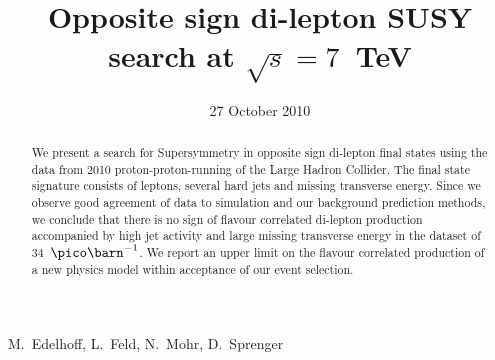 \documentclass{cmspaper}
\newcommand{\pb}{\pico\barn}
\newcommand{\pbi}{\ensuremath{\pb^{-1}}}
\begin{document}
\linenumbers



\begin{titlepage}

   \date{27 October 2010}

  \title{Opposite sign di-lepton SUSY search at $\sqrt{s}=7$~TeV}

  \begin{Authlist}
      M.~Edelhoff, L.~Feld, N.~Mohr, D.~Sprenger
  \end{Authlist}

  \begin{abstract}
  We present a search for Supersymmetry in opposite sign di-lepton final states 
  using the data from 2010 proton-proton-running of the Large Hadron Collider. 
  The final state signature consists of leptons, several hard jets 
  and missing transverse energy. 
  Since we observe good agreement of data to simulation and our background prediction methods,
  we conclude that there is no sign of flavour correlated di-lepton production 
  accompanied by high jet activity and large missing transverse energy in the dataset of 34~\pbi.
  We report an upper limit on the flavour correlated production of a new physics model within
  acceptance of our event selection.
  \end{abstract} 

  
\end{titlepage}

\setcounter{page}{2}%

\tableofcontents 

\graphicspath{{plots/}}





%

%

%




\end{document}
